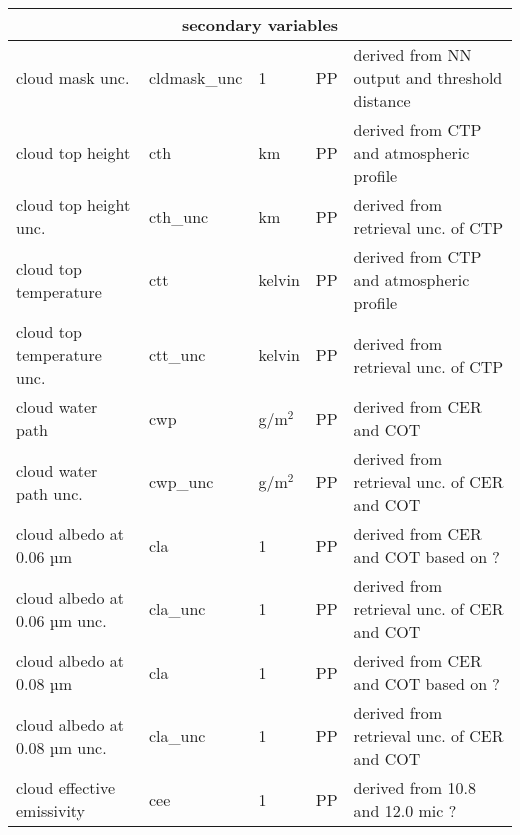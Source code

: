 \begin{table*}[h]
\begin{tabular}{l|l|l|l|l}
    \multicolumn{5}{c}{secondary variables} \\
    \hline
    cloud mask unc. & cldmask\_unc & 1 & PP & derived from NN output and threshold distance \\
    cloud top height & cth & km & PP & derived from CTP and atmospheric profile \\
    cloud top height unc. & cth\_unc & km & PP & derived from retrieval unc. of CTP \\
    cloud top temperature & ctt & kelvin & PP & derived from CTP and atmospheric profile \\
    cloud top temperature unc. & ctt\_unc & kelvin & PP & derived from retrieval unc. of CTP \\
    cloud water path & cwp & g/m$^2$ & PP & derived from CER and COT \citep{Nakajima90} \\
    cloud water path unc. & cwp\_unc & g/m$^2$ & PP & derived from retrieval unc. of CER and COT \\
    cloud albedo at 0.06 µm & cla & 1 & PP & derived from CER and COT based on ? \\
    cloud albedo at 0.06 µm unc. & cla\_unc & 1 & PP & derived from retrieval unc. of CER and COT \\
    cloud albedo at 0.08 µm & cla & 1 & PP & derived from CER and COT based on ? \\
    cloud albedo at 0.08 µm unc. & cla\_unc & 1 & PP & derived from retrieval unc. of CER and COT \\
    cloud effective emissivity & cee & 1 & PP & derived from 10.8 and 12.0 mic ? \\
    \hline
  \end{tabular}
  \label{tab:L2_variables}
\end{table*}
